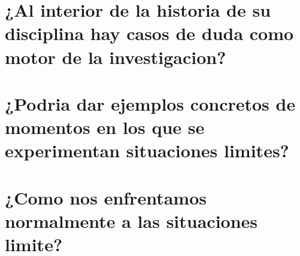     \section{¿Al interior de la historia de su disciplina hay casos de duda como motor de la investigacion?}
    \section{¿Podria dar ejemplos concretos de momentos en los que se experimentan situaciones limites?}
    \section{¿Como nos enfrentamos normalmente a las situaciones limite?}

